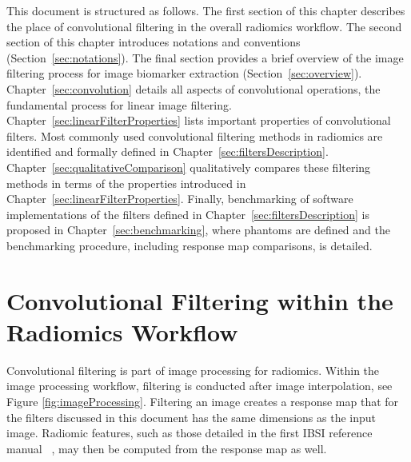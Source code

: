 \documentclass[fleqn,a4paper,oneside,openany]{book}
\begin{document}
This document is structured as follows.
The first section of this chapter describes the place of convolutional filtering in the overall radiomics workflow.
The second section of this chapter introduces notations and conventions (Section~\ref{sec:notations}).
The final section provides a brief overview of the image filtering process for image biomarker extraction (Section~\ref{sec:overview}).
Chapter~\ref{sec:convolution} details all aspects of convolutional operations, the fundamental process for linear image filtering.
Chapter~\ref{sec:linearFilterProperties} lists important properties of convolutional filters.
Most commonly used convolutional filtering methods in radiomics are identified and formally defined in Chapter~\ref{sec:filtersDescription}.
Chapter~\ref{sec:qualitativeComparison} qualitatively compares these filtering methods in terms of the properties introduced in Chapter~\ref{sec:linearFilterProperties}.
Finally, benchmarking of software implementations of the filters defined in Chapter~\ref{sec:filtersDescription} is proposed in Chapter~\ref{sec:benchmarking}, where phantoms are defined and the benchmarking procedure, including response map comparisons, is detailed. 

\section{Convolutional Filtering within the Radiomics Workflow}\label{sec:overallWorkflow}
Convolutional filtering is part of image processing for radiomics. Within the image processing workflow, filtering is conducted after image interpolation, see Figure \ref{fig:imageProcessing}. Filtering an image creates a response map that for the filters discussed in this document has the same dimensions as the input image. Radiomic features, such as those detailed in the first IBSI reference manual ~\cite{ZLV2017}, may then be computed from the response map as well.
\end{document}
